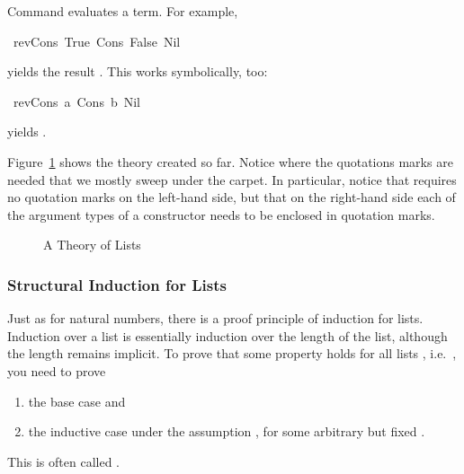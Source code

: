 \begin{isabellebody}
\begin{isamarkuptext}
Command  evaluates a term. For example,%
\end{isamarkuptext}%
\isamarkuptrue%
\isamarkupfalse%
\ {}rev{}Cons\ True\ {}Cons\ False\ Nil{}{}{}%
\begin{isamarkuptext}%
yields the result . This works symbolically, too:%
\end{isamarkuptext}%
\isamarkuptrue%
\isamarkupfalse%
\ {}rev{}Cons\ a\ {}Cons\ b\ Nil{}{}{}%
\begin{isamarkuptext}%
yields .
\medskip

Figure~\ref{fig:MyList} shows the theory created so far. Notice where the
quotations marks are needed that we mostly sweep under the carpet.  In
particular, notice that  requires no quotation marks on the
left-hand side, but that on the right-hand side each of the argument
types of a constructor needs to be enclosed in quotation marks.

\begin{figure}[htbp]
\begin{alltt}
\end{alltt}
\caption{A Theory of Lists}
\label{fig:MyList}
\end{figure}

\subsubsection{Structural Induction for Lists}

Just as for natural numbers, there is a proof principle of induction for
lists. Induction over a list is essentially induction over the length of
the list, although the length remains implicit. To prove that some property
 holds for all lists , i.e.\ \mbox{},
you need to prove
\begin{enumerate}
\item the base case  and
\item the inductive case  under the assumption , for some arbitrary but fixed .
\end{enumerate}
This is often called .


\end{isamarkuptext}
\end{isabellebody}
